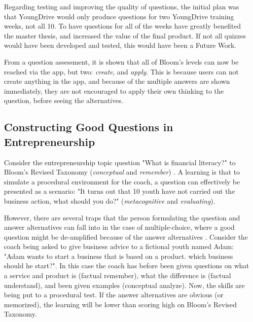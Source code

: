 
  Regarding testing and improving the quality of questions, the initial plan was that YoungDrive would only produce questions for two YoungDrive training weeks, not all 10. To have questions for all of the weeks have greatly benefited the master thesis, and increased the value of the final product. If not all quizzes would have been developed and tested, this would have been a Future Work.

  From a question assessment, it is shown that all of Bloom's levels can now be reached via the app, but two: \textit{create}, and \textit{apply}. This is because users can not create anything in the app, and because of the multiple answers are shown immediately, they are not encouraged to apply their own thinking to the question, before seeing the alternatives.

  \subsection{Constructing Good Questions in Entrepreneurship}

  Consider the entrepreneurship topic question "What is financial literacy?" to Bloom's Revised Taxonomy (\textit{conceptual} and \textit{remember}) \citep{krathwohl}. A learning is that to simulate a procedural environment for the coach, a question can effectively be presented as a scenario: "It turns out that 10 youth have not carried out the business action, what should you do?" (\textit{metacognitive} and \textit{evaluating}).

  However, there are several traps that the person formulating the question and answer alternatives can fall into in the case of multiple-choice, where a good question might be de-amplified because of the answer alternatives \citep{nicol}. Consider the coach being asked to give business advice to a fictional youth named Adam: "Adam wants to start a business that is based on a product. which business should he start?". In this case the coach has before been given questions on what a service and product is (factual remember), what the difference is (factual understand), and been given examples (conceptual analyze). Now, the skills are being put to a procedural test. If the answer alternatives are obvious (or memorized), the learning will be lower than scoring high on Bloom's Revised Taxonomy.


